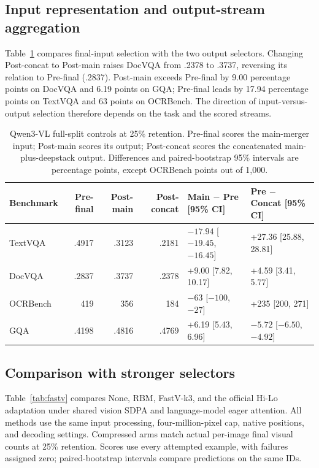 \documentclass[10pt,twocolumn,letterpaper]{article}
\begin{document}
\subsection{Input representation and output-stream aggregation}
Table~\ref{tab:stage} compares final-input selection with the two output selectors. Changing Post-concat to Post-main raises DocVQA from .2378 to .3737, reversing its relation to Pre-final (.2837). Post-main exceeds Pre-final by 9.00 percentage points on DocVQA and 6.19 points on GQA; Pre-final leads by 17.94 percentage points on TextVQA and 63 points on OCRBench. The direction of input-versus-output selection therefore depends on the task and the scored streams.

\begin{table}[t]
\centering
\caption{\label{tab:stage}Qwen3-VL full-split controls at 25\% retention. Pre-final scores the main-merger input; Post-main scores its output; Post-concat scores the concatenated main-plus-deepstack output. Differences and paired-bootstrap 95\% intervals are percentage points, except OCRBench points out of 1,000.}
\small
\begin{tabular}{lrrrll}
\toprule
Benchmark & Pre-final & Post-main & Post-concat & Main $-$ Pre [95\% CI] & Pre $-$ Concat [95\% CI]\\
\midrule
TextVQA & .4917 & .3123 & .2181 & $-17.94$ [$-19.45$, $-16.45$] & +27.36 [25.88, 28.81]\\
DocVQA & .2837 & .3737 & .2378 & +9.00 [7.82, 10.17] & +4.59 [3.41, 5.77]\\
OCRBench & 419 & 356 & 184 & $-63$ [$-100$, $-27$] & +235 [200, 271]\\
GQA & .4198 & .4816 & .4769 & +6.19 [5.43, 6.96] & $-5.72$ [$-6.50$, $-4.92$]\\
\bottomrule
\end{tabular}
\end{table}

\subsection{Comparison with stronger selectors}
Table~\ref{tab:fastv} compares None, RBM, FastV-k3, and the official Hi-Lo adaptation under shared vision SDPA and language-model eager attention. All methods use the same input processing, four-million-pixel cap, native positions, and decoding settings. Compressed arms match actual per-image final visual counts at 25\% retention. Scores use every attempted example, with failures assigned zero; paired-bootstrap intervals compare predictions on the same IDs.
\end{document}
